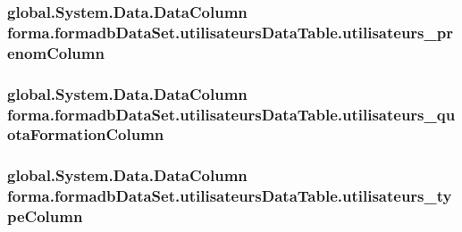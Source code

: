 \subsubsection[{\texorpdfstring{utilisateurs\+\_\+prenom\+Column}{utilisateurs_prenomColumn}}]{\setlength{\rightskip}{0pt plus 5cm}global.\+System.\+Data.\+Data\+Column forma.\+formadb\+Data\+Set.\+utilisateurs\+Data\+Table.\+utilisateurs\+\_\+prenom\+Column\hspace{0.3cm}{\ttfamily [get]}}\hypertarget{classforma_1_1formadb_data_set_1_1utilisateurs_data_table_a117714396a353a60451d38a544eb89b7}{}\label{classforma_1_1formadb_data_set_1_1utilisateurs_data_table_a117714396a353a60451d38a544eb89b7}
\subsubsection[{\texorpdfstring{utilisateurs\+\_\+quota\+Formation\+Column}{utilisateurs_quotaFormationColumn}}]{\setlength{\rightskip}{0pt plus 5cm}global.\+System.\+Data.\+Data\+Column forma.\+formadb\+Data\+Set.\+utilisateurs\+Data\+Table.\+utilisateurs\+\_\+quota\+Formation\+Column\hspace{0.3cm}{\ttfamily [get]}}\hypertarget{classforma_1_1formadb_data_set_1_1utilisateurs_data_table_a8d25ecd222ebc83ff3927a5f792ce6c8}{}\label{classforma_1_1formadb_data_set_1_1utilisateurs_data_table_a8d25ecd222ebc83ff3927a5f792ce6c8}
\subsubsection[{\texorpdfstring{utilisateurs\+\_\+type\+Column}{utilisateurs_typeColumn}}]{\setlength{\rightskip}{0pt plus 5cm}global.\+System.\+Data.\+Data\+Column forma.\+formadb\+Data\+Set.\+utilisateurs\+Data\+Table.\+utilisateurs\+\_\+type\+Column\hspace{0.3cm}{\ttfamily [get]}}\hypertarget{classforma_1_1formadb_data_set_1_1utilisateurs_data_table_ada8e6bc4864449792b192c0a04b7fc19}{}\label{classforma_1_1formadb_data_set_1_1utilisateurs_data_table_ada8e6bc4864449792b192c0a04b7fc19}


